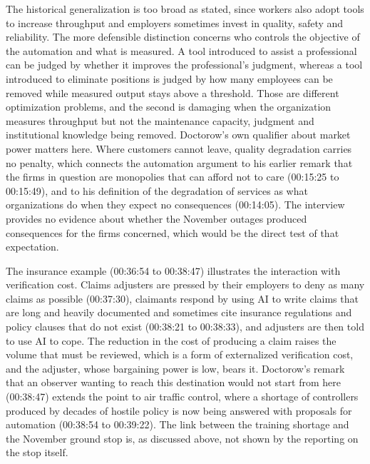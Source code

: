 \documentclass[12pt]{article}
\newcommand{\ts}[1]{(#1)}
\begin{document}
The historical generalization is too broad as stated, since workers also adopt tools to increase throughput and employers sometimes invest in quality, safety and reliability. The more defensible distinction concerns who controls the objective of the automation and what is measured. A tool introduced to assist a professional can be judged by whether it improves the professional's judgment, whereas a tool introduced to eliminate positions is judged by how many employees can be removed while measured output stays above a threshold. Those are different optimization problems, and the second is damaging when the organization measures throughput but not the maintenance capacity, judgment and institutional knowledge being removed. Doctorow's own qualifier about market power matters here. Where customers cannot leave, quality degradation carries no penalty, which connects the automation argument to his earlier remark that the firms in question are monopolies that can afford not to care \ts{00:15:25 to 00:15:49}, and to his definition of the degradation of services as what organizations do when they expect no consequences \ts{00:14:05}. The interview provides no evidence about whether the November outages produced consequences for the firms concerned, which would be the direct test of that expectation.

The insurance example \ts{00:36:54 to 00:38:47} illustrates the interaction with verification cost. Claims adjusters are pressed by their employers to deny as many claims as possible \ts{00:37:30}, claimants respond by using AI to write claims that are long and heavily documented and sometimes cite insurance regulations and policy clauses that do not exist \ts{00:38:21 to 00:38:33}, and adjusters are then told to use AI to cope. The reduction in the cost of producing a claim raises the volume that must be reviewed, which is a form of externalized verification cost, and the adjuster, whose bargaining power is low, bears it. Doctorow's remark that an observer wanting to reach this destination would not start from here \ts{00:38:47} extends the point to air traffic control, where a shortage of controllers produced by decades of hostile policy is now being answered with proposals for automation \ts{00:38:54 to 00:39:22}. The link between the training shortage and the November ground stop is, as discussed above, not shown by the reporting on the stop itself.
\end{document}
